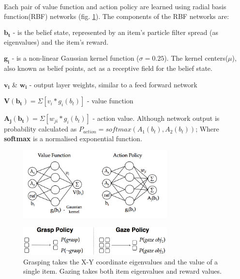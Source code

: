 \documentclass[11]{article}
\begin{document}
Each pair of value function and action policy are learned using radial basis function(RBF) networks (fig. \ref{fig:rbf}).
The components of the RBF networks are:
\begin{list}{}{}
 \item $\pmb{b_t}$ - is the belief state, represented by an item's particle filter spread (as eigenvalues) and the item's reward. 

 \item $\pmb{g_i}$ - is a non-linear Gaussian kernel function ($\sigma=0.25$).
   The kernel centers($\mu$), also known as belief points, act as a receptive field for the belief state.

 \item $\pmb{v_i}$ \& $\pmb{w_i}$ - output layer weights, similar to a feed forward network

 \item $\pmb{V(b_t)}= \Sigma[v_i * g_i(b_t)]$ - value function

 \item $\pmb{A_j(b_t)}= \Sigma[w_{ji} * g_i(b_t)]$ - action value.
   Although network output is probability calculated as $P_{action} = softmax(A_1(b_t),A_2(b_t))$; 
   Where \textbf{softmax} is a normalised exponential function.
\end{list}

\begin{figure}[h]
	\centering
	\includegraphics[width=0.7\textwidth]{figures/rbf.png}
	\caption{}
	\label{fig:rbf}
\end{figure} 

\begin{figure}[h]
	\centering
	\includegraphics[width=0.7\textwidth]{figures/inputoutput.png}
	\caption{Grasping takes the X-Y coordinate eigenvalues and the value of a single item. Gazing takes both item eigenvalues and reward values.}
	\label{fig:inout}
\end{figure}
\end{document}
